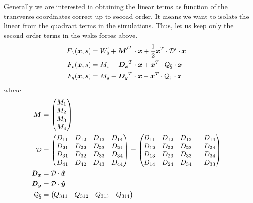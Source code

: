 \begin{apendicesenv}
    Generally we are interested in obtaining the linear terms as function of the transverse coordinates correct up to second order. It means we want to isolate the linear from the quadract terms in the simulations. Thus, let us keep only the second order terms in the wake forces above.
    \begin{align}
		F_L(\boldsymbol{x},s) &= W_0' + \boldsymbol{M'}^T \cdot \boldsymbol{x} + \frac12\boldsymbol{x}^T \cdot \mathcal{D'}  \cdot \boldsymbol{x} \\
		F_x(\boldsymbol{x},s) &= M_x + \boldsymbol{D_x}^T \cdot \boldsymbol{x} +        \boldsymbol{x}^T \cdot \mathcal{Q_x} \cdot \boldsymbol{x} \\
		F_y(\boldsymbol{x},s) &= M_y + \boldsymbol{D_y}^T \cdot \boldsymbol{x} +        \boldsymbol{x}^T \cdot \mathcal{Q_y} \cdot \boldsymbol{x}
    \end{align}
    where
    \begin{align}
		\vect{M} &= \begin{pmatrix*}[r] M_{1}\\ M_{2}\\ M_{3}\\ M_{4}\end{pmatrix*} \\
		\tensor{D}  &= \begin{pmatrix*}[r] D_{11} & D_{12} & D_{13} & D_{14} \\
                                   D_{21} & D_{22} & D_{23} & D_{24} \\
                                   D_{31} & D_{32} & D_{33} & D_{34} \\
                                   D_{41} & D_{42} & D_{43} & D_{44}
               \end{pmatrix*} =
               \begin{pmatrix*}[r] D_{11} & D_{12} & D_{13} & D_{14} \\
                                   D_{12} & D_{22} & D_{23} & D_{24} \\
                                   D_{13} & D_{23} & D_{33} & D_{34} \\
                                   D_{14} & D_{24} & D_{34} & -D_{33}
               \end{pmatrix*}\\
		\vect{D_x} &= \tensor{D}\cdot \vect{\hat{x}} \\
		\vect{D_y} &= \tensor{D}\cdot \vect{\hat{y}} \\
		\tensor{Q_x}&= \begin{pmatrix*}[r] Q_{311} & Q_{312} & Q_{313} & Q_{314} \\

\end{pmatrix*}
\end{align}
\end{apendicesenv}
